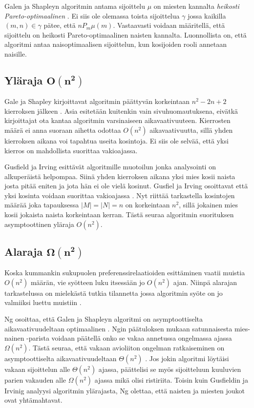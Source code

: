 \documentclass[gradu, twoside]{tktltiki}
\begin{document}
Galen ja Shapleyn algoritmin antama sijoittelu $\mu$ on miesten
kannalta \emph{heikosti Pareto-optimaalinen} \cite[sivu
  13]{gusfield89}. Ei siis ole olemassa toista sijoittelua $\gamma$
jossa kaikilla $(m, n) \in \gamma$ pätee, että $nP_m\mu(m)$.
Vastaavasti voidaan määritellä, että sijoittelu on heikosti
Pareto-optimaalinen naisten kannalta. Luonnollista on, että algoritmi
antaa naisoptimaalisen sijoittelun, kun kosijoiden rooli annetaan
naisille.

\subsection{Yläraja $\boldsymbol{O(n^2)}$}

Gale ja Shapley kirjoittavat algoritmin päättyvän korkeintaan $n^2 -
2n + 2$ kierroksen jälkeen \cite{galeshapley62}. Asia esitetään
kuitenkin vain sivuhuomautuksena, eivätkä kirjoittajat ota kantaa
algoritmin varsinaiseen aikavaativuuteen. Kierrosten määrä ei anna
suoraan aihetta odottaa $O(n^2)$ aikavaativuutta, sillä yhden
kierroksen aikana voi tapahtua useita kosintoja. Ei siis ole selvää,
että yksi kierros on mahdollista suorittaa
vakioajassa. \enlargethispage{\baselineskip}

Gusfield ja Irving esittävät algoritmille muotoilun \cite[sivu
  9]{gusfield89} jonka analysointi on alkuperäistä helpompaa. Siinä
yhden kierroksen aikana yksi mies kosii naista josta pitää eniten ja
jota hän ei ole vielä kosinut. Gusfiel ja Irving osoittavat että yksi
kosinta voidaan suorittaa vakioajassa \cite[sivu 14]{gusfield89}. Nyt
riittää tarkastella kosintojen määrää joka tapauksessa $|M| = |N| = n$
on korkeintaan $n^2$, sillä jokainen mies kosii jokaista naista
korkeintaan kerran. Tästä seuraa algoritmin suorituksen asymptoottinen
yläraja $O(n^2)$. \cite[sivu 14]{gusfield89}

\subsection{Alaraja $\boldsymbol{\Omega(n^2)}$}

Koska kummankin sukupuolen preferenssirelaatioiden esittäminen vaatii
muistia $O(n^2)$ määrän, vie syötteen luku itsessään jo $O(n^2)$ ajan.
Niinpä alarajan tarkastelussa on mielekästä tutkia tilannetta jossa
algoritmin syöte on jo valmiiksi luettu muistiin \cite{cheng89}.

Ng osoittaa, että Galen ja Shapleyn algoritmi on asymptoottiselta
aikavaativuudeltaan optimaalinen \cite{cheng89}. Ngin päätuloksen
mukaan satunnaisesta mies-nainen -parista voidaan päätellä onko se
vakaa annetussa ongelmassa ajassa $\Omega(n^2)$. Tästä seuraa, että
vakaan avioliiton ongelman ratkaiseminen on asymptoottiselta
aikavaativuudeltaan $\Theta(n^2)$ \cite{cheng89}. Jos jokin algoritmi
löytäisi vakaan sijoittelun alle $\Theta(n^2)$ ajassa, päättelisi se
myös sijoitteluun kuuluvien parien vakauden alle $\Omega(n^2)$ ajassa
mikä olisi ristiriita. Toisin kuin Gusfieldin ja Irvinig analyysi
algoritmin ylärajasta, Ng olettaa, että naisten ja miesten joukot ovat
yhtämahtavat.
\end{document}
